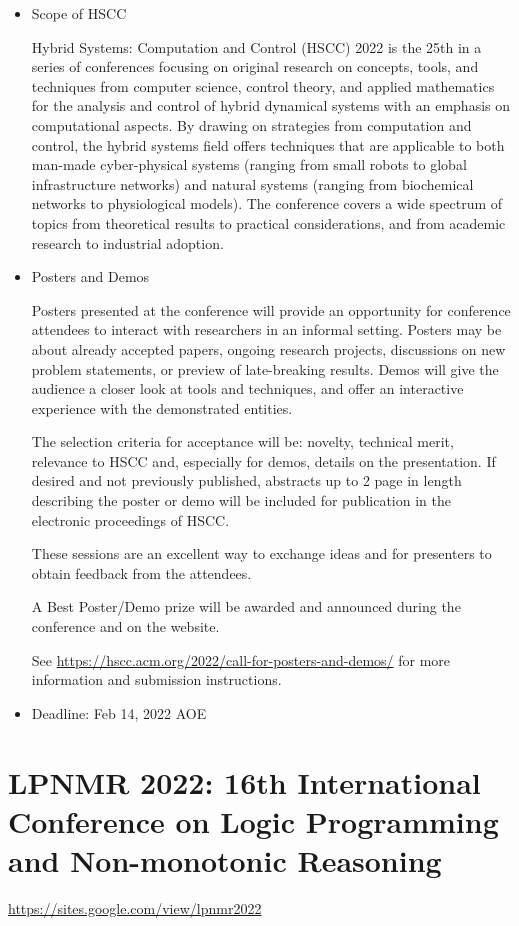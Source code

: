 \documentclass[prodmode,acmtecs]{acmsmall} %
\begin{document}
\begin{itemize}\item  Scope of HSCC 
 
  Hybrid Systems: Computation and Control (HSCC) 2022 is the 25th in a series of conferences focusing on original research on concepts, tools, and techniques from computer science, control theory, and applied mathematics for the analysis and control of hybrid dynamical systems with an emphasis on computational aspects. By drawing on strategies from computation and control, the hybrid systems field offers techniques that are applicable to both man-made cyber-physical systems (ranging from small robots to global infrastructure networks) and natural systems (ranging from biochemical networks to physiological models). The conference covers a wide spectrum of topics from theoretical results to practical considerations, and from academic research to industrial adoption. 
 
\item  Posters and Demos 
 
  Posters presented at the conference will provide an opportunity for conference attendees to interact with researchers in an informal setting. Posters may be about already accepted papers, ongoing research projects, discussions on new problem statements, or preview of late-breaking results. Demos will give the audience a closer look at tools and techniques, and offer an interactive experience with the demonstrated entities. 
 
  The selection criteria for acceptance will be: novelty, technical merit, relevance to HSCC and, especially for demos, details on the presentation. If desired and not previously published, abstracts up to 2 page in length describing the poster or demo will be included for publication in the electronic proceedings of HSCC.   
 
  These sessions are an excellent way to exchange ideas and for presenters to obtain feedback from the attendees. 
 
  A Best Poster/Demo prize will be awarded and announced during the conference and on the website. 
 
  See \href{https://hscc.acm.org/2022/call-for-posters-and-demos/}{https://hscc.acm.org/2022/call-for-posters-and-demos/} for more information and submission instructions. 
 
\item  Deadline: Feb 14, 2022  AOE 
 
\end{itemize}\section{LPNMR 2022: 16th International Conference on Logic Programming and Non-monotonic Reasoning  }\label{LPNMR2022}  \href{https://sites.google.com/view/lpnmr2022}{https://sites.google.com/view/lpnmr2022} \\ 
\end{document}
